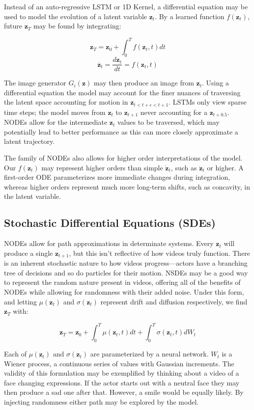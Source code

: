 \documentclass[tablecaption=bottom,pmlr]{jmlr}
\begin{document}
Instead of an auto-regressive LSTM or 1D Kernel, a differential equation may be used to model the evolution of a latent variable $\mathbf{z}_t$. By a learned function $f(\mathbf{z}_t)$, future $\mathbf{z}_{T}$ may be found by integrating:

$$\mathbf{z}_{T} = \mathbf{z}_0 + \int_0^{T} f(\mathbf{z}_t,t) dt$$
$$\dot{\mathbf{z}_t}=\frac{d\mathbf{z}_t}{dt}=f(\mathbf{z}_t,t)$$

The image generator $G_i(\mathbf{z})$ may then produce an image from $\mathbf{z}_t$. Using a differential equation the model may account for the finer nuances of traversing the latent space accounting for motion in $\mathbf{z}_{t<t+\epsilon<t+1}$. LSTMs only view sparse time steps; the model moves from $\mathbf{z}_t$ to $\mathbf{z}_{t+1}$ never accounting for a $\mathbf{z}_{t+0.5}$. NODEs allow for the intermediate $\mathbf{z}_t$ values to be traversed, which may potentially lead to better performance as this can more closely approximate a latent trajectory.

The family of NODEs also allows for higher order interpretations of the model. Our $f(\mathbf{z}_t)$ may represent higher orders than simple $\dot{\mathbf{z}}_t$, such as $\ddot{\mathbf{z}}_t$ or higher. A first-order ODE parameterizes more immediate changes during integration, whereas higher orders represent much more long-term shifts, such as concavity, in the latent variable.

\subsection{Stochastic Differential Equations (SDEs)}

NODEs allow for path approximations in determinate systems. Every $\mathbf{z}_t$ will produce a single $\mathbf{z}_{t+1}$, but this isn't reflective of how videos truly function. There is an inherent stochastic nature to how videos progress---actors have a branching tree of decisions and so do particles for their motion. NSDEs may be a good way to represent the random nature present in videos, offering all of the benefits of NODEs while allowing for randomness with their added noise. Under this form, and letting $\mu(\mathbf{z}_t)$ and $\sigma(\mathbf{z}_t)$ represent drift and diffusion respectively, we find $\mathbf{z}_{T}$ with:

$$\mathbf{z}_{T} = \mathbf{z}_0 + \int_0^T \mu(\mathbf{z}_t,t) dt + \int_0^{T} \sigma(\mathbf{z}_t,t) dW_t$$

Each of $\mu(\mathbf{z}_t)$ and $\sigma(\mathbf{z}_t)$ are parameterized by a neural network. $W_t$ is a Wiener process, a continuous series of values with Gaussian increments.  The validity of this formulation may be exemplified by thinking about a video of a face changing expressions. If the actor starts out with a neutral face they may then produce a sad one after that. However, a smile would be equally likely. By injecting randomness either path may be explored by the model.
\end{document}
